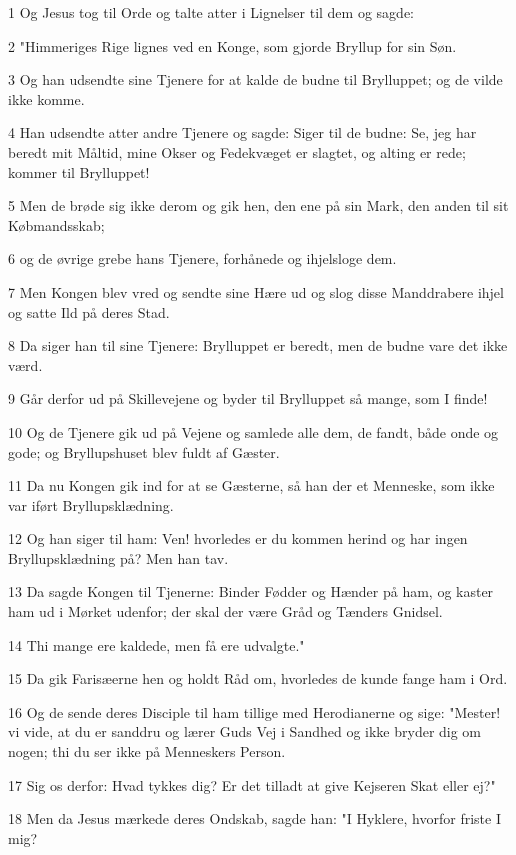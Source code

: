 \par 1 Og Jesus tog til Orde og talte atter i Lignelser til dem og sagde:
\par 2 "Himmeriges Rige lignes ved en Konge, som gjorde Bryllup for sin Søn.
\par 3 Og han udsendte sine Tjenere for at kalde de budne til Brylluppet; og de vilde ikke komme.
\par 4 Han udsendte atter andre Tjenere og sagde: Siger til de budne: Se, jeg har beredt mit Måltid, mine Okser og Fedekvæget er slagtet, og alting er rede; kommer til Brylluppet!
\par 5 Men de brøde sig ikke derom og gik hen, den ene på sin Mark, den anden til sit Købmandsskab;
\par 6 og de øvrige grebe hans Tjenere, forhånede og ihjelsloge dem.
\par 7 Men Kongen blev vred og sendte sine Hære ud og slog disse Manddrabere ihjel og satte Ild på deres Stad.
\par 8 Da siger han til sine Tjenere: Brylluppet er beredt, men de budne vare det ikke værd.
\par 9 Går derfor ud på Skillevejene og byder til Brylluppet så mange, som I finde!
\par 10 Og de Tjenere gik ud på Vejene og samlede alle dem, de fandt, både onde og gode; og Bryllupshuset blev fuldt af Gæster.
\par 11 Da nu Kongen gik ind for at se Gæsterne, så han der et Menneske, som ikke var iført Bryllupsklædning.
\par 12 Og han siger til ham: Ven! hvorledes er du kommen herind og har ingen Bryllupsklædning på? Men han tav.
\par 13 Da sagde Kongen til Tjenerne: Binder Fødder og Hænder på ham, og kaster ham ud i Mørket udenfor; der skal der være Gråd og Tænders Gnidsel.
\par 14 Thi mange ere kaldede, men få ere udvalgte."
\par 15 Da gik Farisæerne hen og holdt Råd om, hvorledes de kunde fange ham i Ord.
\par 16 Og de sende deres Disciple til ham tillige med Herodianerne og sige: "Mester! vi vide, at du er sanddru og lærer Guds Vej i Sandhed og ikke bryder dig om nogen; thi du ser ikke på Menneskers Person.
\par 17 Sig os derfor: Hvad tykkes dig? Er det tilladt at give Kejseren Skat eller ej?"
\par 18 Men da Jesus mærkede deres Ondskab, sagde han: "I Hyklere, hvorfor friste I mig?
